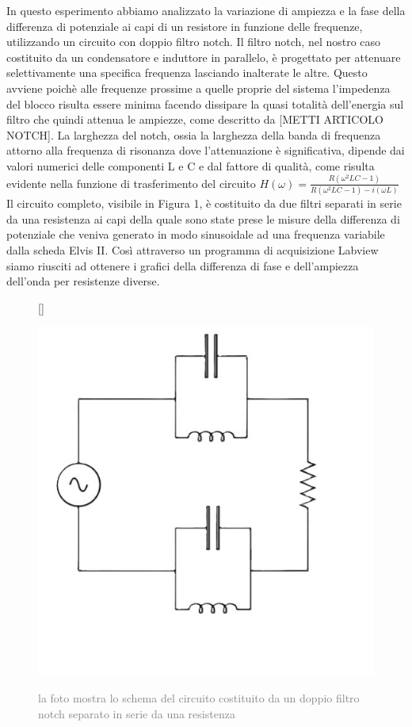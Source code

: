 \documentclass[12pt, letterpaper]{article}
\begin{document}
In questo esperimento abbiamo analizzato la variazione di ampiezza e la fase della differenza di potenziale ai capi di un resistore in funzione delle frequenze, utilizzando un circuito con doppio filtro notch. Il filtro notch, nel nostro caso costituito da un condensatore e induttore in parallelo, è progettato per attenuare selettivamente una specifica frequenza lasciando inalterate le altre. Questo avviene poichè alle frequenze prossime a quelle proprie del sistema l'impedenza del blocco risulta essere minima facendo dissipare la quasi totalità dell’energia sul filtro che quindi attenua le ampiezze, come descritto da [METTI ARTICOLO NOTCH]. La larghezza del notch, ossia la larghezza della banda di frequenza attorno alla frequenza di risonanza dove l'attenuazione è significativa, dipende dai valori numerici delle componenti L e C e dal fattore di qualità, come risulta evidente nella funzione di trasferimento del circuito  $H(\omega) = \frac{R(\omega^2 LC-1)}{R(\omega^2 LC -1) -i(\omega L)}$
Il circuito completo, visibile in Figura 1, è costituito da due filtri separati in serie da una resistenza ai capi della quale sono state prese le misure della differenza di potenziale che veniva generato in modo sinusoidale ad una frequenza variabile dalla scheda Elvis II. Così attraverso un programma di acquisizione Labview siamo riusciti ad ottenere i grafici della differenza di fase e dell’ampiezza dell’onda per resistenze diverse. 
\begin{figure}[h]
[\FBwidth]
{\caption{\textcolor{gray}{la foto mostra lo schema del circuito costituito da un doppio filtro notch separato in serie da una resistenza}}
\label{fig:figura}}
{\includegraphics[width=0.6\linewidth]{circuito.jpeg}}
\end{figure}
\end{document}
